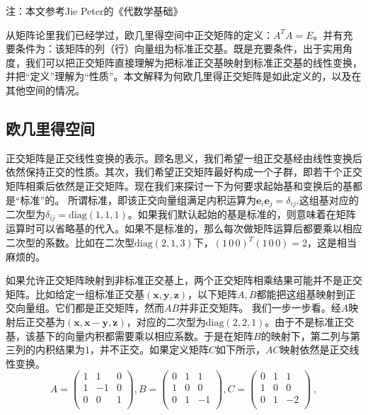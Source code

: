 

注：本文参考Jie Peter的《代数学基础》

从矩阵论里我们已经学过，欧几里得空间中正交矩阵的定义：$A^T A=E$。并有充要条件为：该矩阵的列（行）向量组为标准正交基。既是充要条件，出于实用角度，我们可以把正交矩阵直接理解为把标准正交基映射到标准正交基的线性变换，并把“定义”理解为“性质”。本文解释为何欧几里得正交矩阵是如此定义的，以及在其他空间的情况。
\subsection{欧几里得空间}
正交矩阵是正交线性变换的表示。顾名思义，我们希望一组正交基经由线性变换后依然保持正交的性质。其次，我们希望正交矩阵最好构成一个子群，即若干个正交矩阵相乘后依然是正交矩阵。现在我们来探讨一下为何要求起始基和变换后的基都是“标准”的。
所谓标准，即该正交向量组满足内积运算为$\boldsymbol{e}_i\boldsymbol{e}_j=\delta_{ij}$.这组基对应的二次型为$\delta_{ij}=\mathrm {diag}(1,1,1)$。如果我们默认起始的基是标准的，则意味着在矩阵运算时可以省略基的代入。如果不是标准的，那么每次做矩阵运算后都要乘以相应二次型的系数。比如在二次型$\mathrm {diag}(2,1,3)$下，$(1\,0\,0)^T (1\,0\,0)=2$，这是相当麻烦的。


如果允许正交矩阵映射到非标准正交基上，两个正交矩阵相乘结果可能并不是正交矩阵。比如给定一组标准正交基$(\boldsymbol x,\boldsymbol y,\boldsymbol z)$，以下矩阵$A,B$都能把这组基映射到正交向量组。它们都是正交矩阵，然而$AB$并非正交矩阵。
我们一步一步看。经$A$映射后正交基为$(\boldsymbol x,\boldsymbol{x-y},\boldsymbol z)$，对应的二次型为$\mathrm {diag}(2,2,1)$。由于不是标准正交基，该基下的向量内积都需要乘以相应系数。于是在矩阵$B$的映射下，第二列与第三列的内积结果为$1$，并不正交。如果定义矩阵$C$如下所示，$AC$映射依然是正交线性变换。
\begin{equation}
A=\begin{pmatrix}
  1&  1&  0   \\
  1&  -1&  0  \\
  0& 0 & 1   \\
\end{pmatrix},
B=\begin{pmatrix}
  0&  1&  1   \\
  1&  0&  0  \\
  0& 1 & -1   \\
\end{pmatrix},
C=\begin{pmatrix}
  0&  1&  1   \\
  1&  0&  0  \\
  0& 1 & -2   \\
\end{pmatrix}~,
\end{equation}

